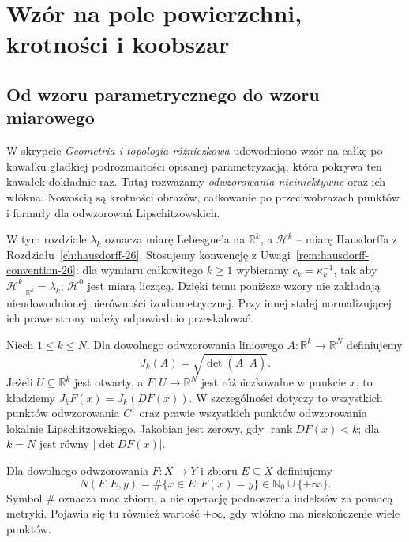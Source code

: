 \chapter{Wzór na pole powierzchni, krotności i koobszar}
\label{ch:area-coarea-28}

\section{Od wzoru parametrycznego do wzoru miarowego}
W skrypcie \emph{Geometria i topologia różniczkowa}
udowodniono wzór na całkę po kawałku gładkiej
podrozmaitości opisanej parametryzacją, która
pokrywa ten kawałek dokładnie raz. Tutaj rozważamy
\emph{odwzorowania nieiniektywne} oraz ich włókna.
Nowością są krotności obrazów, całkowanie po
przeciwobrazach punktów i formuły dla
odwzorowań Lipschitzowskich.

W tym rozdziale $\lambda_k$ oznacza miarę Lebesgue'a
na $\mathbb R^k$, a $\mathcal H^k$ -- miarę
Hausdorffa z Rozdziału~\ref{ch:hausdorff-26}.
Stosujemy konwencję z
Uwagi~\ref{rem:hausdorff-convention-26}: dla wymiaru
całkowitego $k\ge1$ wybieramy $c_k=\kappa_k^{-1}$,
tak aby $\mathcal H^k|_{\mathbb R^k}=\lambda_k$;
$\mathcal H^0$ jest miarą liczącą.
Dzięki temu poniższe wzory nie zakładają
nieudowodnionej nierówności izodiametrycznej.
Przy innej stałej normalizującej ich prawe strony
należy odpowiednio przeskalować.

\begin{definicja}
\label{def:k-jacobian-28}
Niech $1\le k\le N$. Dla dowolnego odwzorowania
liniowego $A:\mathbb R^k\to\mathbb R^N$ definiujemy
\[
 J_k(A)=\sqrt{\det(A^{\mathsf T}A)}.
\]
Jeżeli $U\subseteq\mathbb R^k$ jest otwarty,
a $F:U\to\mathbb R^N$ jest różniczkowalne
w punkcie $x$, to kładziemy $J_kF(x)=J_k(DF(x))$.
W szczególności dotyczy to wszystkich punktów odwzorowania
$C^1$ oraz prawie wszystkich punktów odwzorowania
lokalnie Lipschitzowskiego. Jakobian jest zerowy,
gdy $\operatorname{rank}DF(x)<k$; dla $k=N$
jest równy $|\det DF(x)|$.
\end{definicja}

\begin{definicja}
\label{def:multiplicity-28}
Dla dowolnego odwzorowania $F:X\to Y$
i zbioru $E\subseteq X$ definiujemy
\[
 N(F,E,y)=\#\{x\in E:F(x)=y\}\in\mathbb N_0\cup\{+\infty\}.
\]
Symbol $\#$ oznacza moc zbioru, a nie operację
podnoszenia indeksów za pomocą metryki.
Pojawia się tu również wartość $+\infty$,
gdy włókno ma nieskończenie wiele punktów.
\end{definicja}

